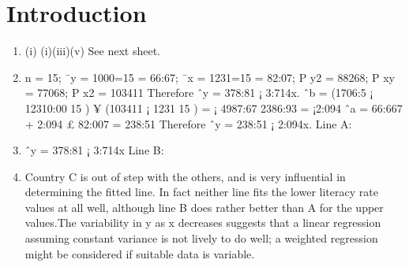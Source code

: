 \documentclass[a4paper,12pt]{article}
\begin{document}
\section{Introduction}
\begin{enumerate}
    \item (i) (i)(iii)(v) See next sheet.
    \item n = 15; ¯y = 1000=15 = 66:67; ¯x = 1231=15 = 82:07;
P
y2 = 88268;
P
xy =
77068;
P
x2 = 103411 Therefore ˆy = 378:81 ¡ 3:714x.
ˆb
= (1706:5 ¡
12310:00
15
) ¥ (103411 ¡
1231
15
) = ¡
4987:67
2386:93
= ¡2:094
ˆa = 66:667 + 2:094 £ 82:007 = 238:51 Therefore ˆy = 238:51 ¡ 2:094x. Line A:
    \item ˆy = 378:81 ¡ 3:714x Line B:
    \item Country C is out of step with the others, and is very influential in determining the fitted
line. In fact neither line fits the lower literacy rate values at all well, although line B does
rather better than A for the upper values.The variability in y as x decreases suggests
that a linear regression assuming constant variance is not lively to do well; a weighted
regression might be considered if suitable data is variable.
\end{enumerate}
\end{document}
